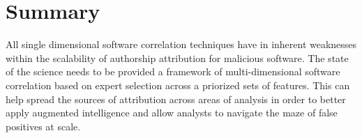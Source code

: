 \documentclass[12pt]{report}
\begin{document}

\section{Summary}
All single dimensional software correlation techniques have in inherent weaknesses within the scalability of authorship attribution for malicious software.  The state of the science needs to be provided a framework of multi-dimensional software correlation based on expert selection across a priorized sets of features.  This can help spread the sources of attribution across areas of analysis in order to better apply augmented intelligence and allow analysts to navigate the maze of false positives at scale.  

\end{document}
